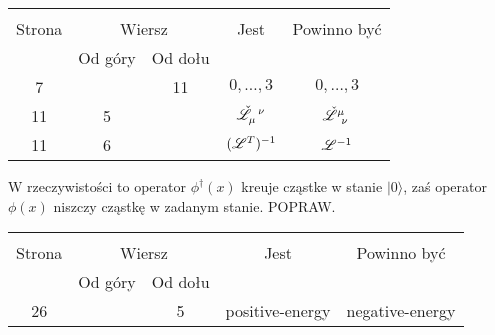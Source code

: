 \documentclass[a4paper,11pt]{article}
\begin{document}


\begin{center}

  \begin{tabular}{|c|c|c|c|c|}
    \hline
    & \multicolumn{2}{c|}{} & & \\
    Strona & \multicolumn{2}{c|}{Wiersz} & Jest
                              & Powinno być \\ \cline{2-3}
    & Od góry & Od dołu & & \\
    \hline
    7   & & 11 & $0, \ldots,\!3$ & $0, \ldots, 3$ \\
    11  &  5 & & $\tensor[]{ \check{ \Lcal } }{ _{ \mu }^{ \nu } }$
           & $\tensor[]{ \check{ \Lcal } }{ ^{ \mu }_{ \nu } }$ \\
    11  &  6 & & $( \mathcal{L}^{ T } )^{ -1 }$ & $\mathcal{L}^{ -1 }$ \\
    \hline
  \end{tabular}

\end{center}


\vspace{\spaceTwo}














 W rzeczywistości to operator $\phi^{ \dagger }( x )$
kreuje cząstke w stanie $| 0 \rangle$, zaś operator $\phi( x )$
niszczy cząstkę w zadanym stanie. POPRAW.





\begin{center}

  \begin{tabular}{|c|c|c|c|c|}
    \hline
    & \multicolumn{2}{c|}{} & & \\
    Strona & \multicolumn{2}{c|}{Wiersz} & Jest
                              & Powinno być \\ \cline{2-3}
    & Od góry & Od dołu & & \\
    \hline
    26  & &  5 & positive-energy & negative-energy \\
    \hline
  \end{tabular}

\end{center}
\end{document}
